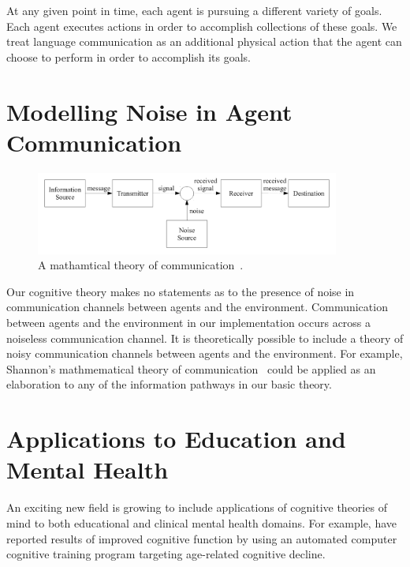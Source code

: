 At any given point in time, each agent is pursuing a different variety
of goals.  Each agent executes actions in order to accomplish
collections of these goals.  We treat language communication as an
additional physical action that the agent can choose to perform in
order to accomplish its goals.

\section{Modelling Noise in Agent Communication}

\begin{figure}[bth]
  \center
  \includegraphics[width=10cm]{gfx/communication_theory}
  \caption[A mathematical theory of communication]{A mathamtical
    theory of communication~\citep{shannon:1959}.}
  \label{fig:communication_theory}
\end{figure}

Our cognitive theory makes no statements as to the presence of noise
in communication channels between agents and the environment.
Communication between agents and the environment in our implementation
occurs across a noiseless communication channel.  It is theoretically
possible to include a theory of noisy communication channels between
agents and the environment.  For example, Shannon's mathmematical
theory of communication~\citep{shannon:1959} could be applied as an
elaboration to any of the information pathways in our basic theory.


%
%

\section{Applications to Education and Mental Health}

An exciting new field is growing to include applications of cognitive
theories of mind to both educational and clinical mental health
domains.  For example, \cite{mahncke:2006} have reported results of
improved cognitive function by using an automated computer cognitive
training program targeting age-related cognitive decline.



